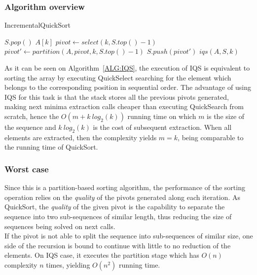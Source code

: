 \subsubsection{Algorithm overview}

\begin{algorithm}
  \caption{IncrementalQuickSort}\label{ALG:IQS}
  \begin{algorithmic}[1]
    \State $S.pop()$
    \Return $A[k]$
    \EndIf
    \State $pivot \gets select(k, S.top()-1)$
    \State $pivot' \gets partition(A,pivot,k, S.top()-1)$
    \State $S.push(pivot')$
    \State \Return $iqs(A,S,k)$
    \EndProcedure
  \end{algorithmic}
\end{algorithm}

As it can be seen on Algorithm~\ref{ALG:IQS}, the execution of IQS is equivalent to sorting the array by executing QuickSelect searching for the element which belongs to the corresponding position in sequential order. The advantage of using IQS for this task is that the stack stores all the previous pivots generated, making next minima extraction calls cheaper than executing QuickSearch from scratch, hence the $O(m + k~log_2(k) ) $ running time on which $m$ is the size of the sequence and $k~log_2(k)$ is the cost of subsequent extraction. When all elements are extracted, then the complexity yields $m = k$, being comparable to the running time of QuickSort.\\

\subsubsection{Worst case}
Since this is a partition-based sorting algorithm, the performance of the sorting operation relies on the \textit{quality} of the pivots generated along each iteration. As QuickSort, the \textit{quality} of the given pivot is the capability to separate the sequence into two sub-sequences of similar length, thus reducing the size of sequences being solved on next calls.\\

If the pivot is not able to split the sequence into sub-sequences of similar size, one side of the recursion is bound to continue with little to no reduction of the elements. On IQS case, it executes the partition stage which has $O(n)$ complexity $n$ times, yielding $O(n^2)$ running time.\\

